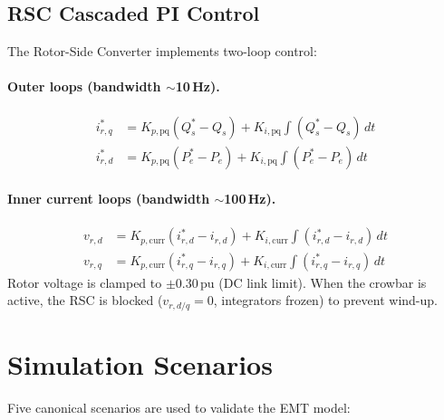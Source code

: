 \documentclass[11pt,a4paper]{article}
\begin{document}
\subsection{RSC Cascaded PI Control}

The Rotor-Side Converter implements two-loop control:

\paragraph{Outer loops (bandwidth $\sim$10\,Hz).}
\begin{align}
  i_{r,q}^\ast &= K_{p,\text{pq}}\left(Q_s^\ast - Q_s\right)
                  + K_{i,\text{pq}}\int\!\left(Q_s^\ast - Q_s\right)\,dt \\
  i_{r,d}^\ast &= K_{p,\text{pq}}\left(P_e^\ast - P_e\right)
                  + K_{i,\text{pq}}\int\!\left(P_e^\ast - P_e\right)\,dt
\end{align}

\paragraph{Inner current loops (bandwidth $\sim$100\,Hz).}
\begin{align}
  v_{r,d} &= K_{p,\text{curr}}\left(i_{r,d}^\ast - i_{r,d}\right)
             + K_{i,\text{curr}}\int\!\left(i_{r,d}^\ast - i_{r,d}\right)\,dt \\
  v_{r,q} &= K_{p,\text{curr}}\left(i_{r,q}^\ast - i_{r,q}\right)
             + K_{i,\text{curr}}\int\!\left(i_{r,q}^\ast - i_{r,q}\right)\,dt
\end{align}
Rotor voltage is clamped to $\pm 0.30$\,pu (DC link limit).
When the crowbar is active, the RSC is blocked ($v_{r,d/q} = 0$,
integrators frozen) to prevent wind-up.

\section{Simulation Scenarios}

Five canonical scenarios are used to validate the EMT model:
\end{document}
